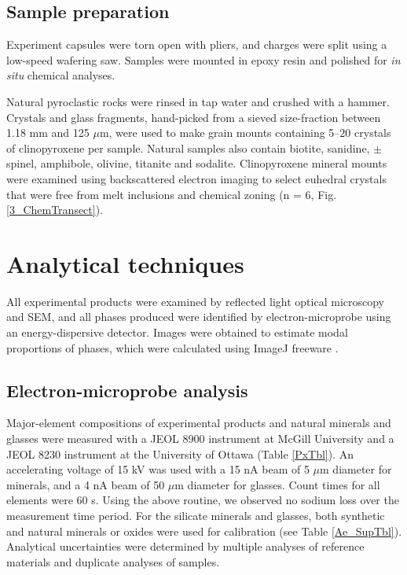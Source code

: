 \documentclass[review,authoryear,12pt]{elsarticle}
\begin{document}
\subsection{Sample preparation}
Experiment capsules were torn open with pliers, and charges were split using a low-speed wafering saw. Samples were mounted in epoxy resin and polished for \textit{in situ} chemical analyses.

Natural pyroclastic rocks were rinsed in tap water and crushed with a hammer. Crystals and glass fragments, hand-picked from a sieved size-fraction between 1.18 mm and 125 $\mu$m, were used to make grain mounts containing 5--20 crystals of clinopyroxene per sample. Natural samples also contain biotite, sanidine, $\pm$ spinel, amphibole, olivine, titanite and sodalite. Clinopyroxene mineral mounts were examined using backscattered electron imaging to select euhedral crystals that were free from melt inclusions and chemical zoning (n = 6, Fig. \ref{3_ChemTransect}).


\section{Analytical techniques}
All experimental products were examined by reflected light optical microscopy and SEM, and all phases produced were identified by electron-microprobe using an energy-dispersive detector. Images were obtained to estimate modal proportions of phases, which were calculated using ImageJ freeware \citep[][see Table \ref{Ae_SupTbl}]{Rasband2016}.

\subsection{Electron-microprobe analysis}
Major-element compositions of experimental products and natural minerals and glasses were measured with a JEOL 8900 instrument at McGill University and a JEOL 8230 instrument at the University of Ottawa (Table \ref{PxTbl}). An accelerating voltage of 15 kV was used with a 15 nA beam of 5 $\mu$m diameter for minerals, and a 4 nA beam of 50 $\mu$m diameter for glasses. Count times for all elements were 60 s. Using the above routine, we observed no sodium loss over the measurement time period.
For the silicate minerals and glasses, both synthetic and natural minerals or oxides were used for calibration (see Table \ref{Ae_SupTbl}). Analytical uncertainties were determined by multiple analyses of reference materials and duplicate analyses of samples. 
\end{document}
